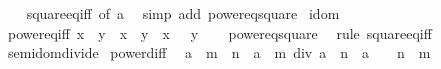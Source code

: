 \begin{isabellebody}
%
\isadelimproof
\ \ %
\endisadelimproof
%
\isatagproof
{}\isamarkupfalse%
\ square{\isacharunderscore}{\kern0pt}eq{\isacharunderscore}{\kern0pt}{}{\isacharunderscore}{\kern0pt}iff\ {\isacharbrackleft}{\kern0pt}of\ a{\isacharbrackright}{\kern0pt}\ \isamarkupfalse%
\ {\isacharparenleft}{\kern0pt}simp\ add{\isacharcolon}{\kern0pt}\ power{}{\isacharunderscore}{\kern0pt}eq{\isacharunderscore}{\kern0pt}square{\isacharparenright}{\kern0pt}%
\endisatagproof
{\isafoldproof}%
%
\isadelimproof
\isanewline
%
\endisadelimproof
\isanewline
{}\isamarkupfalse%
\isanewline
\isanewline
{}\isamarkupfalse%
\ idom\isanewline
{}\isanewline
\isanewline
{}\isamarkupfalse%
\ power{}{\isacharunderscore}{\kern0pt}eq{\isacharunderscore}{\kern0pt}iff{\isacharcolon}{\kern0pt}\ {\isachardoublequoteopen}x\ {\isacharequal}{\kern0pt}\ y\ {\isasymlongleftrightarrow}\ x\ {\isacharequal}{\kern0pt}\ y\ {\isasymor}\ x\ {\isacharequal}{\kern0pt}\ {\isacharminus}{\kern0pt}\ y{\isachardoublequoteclose}\isanewline
%
\isadelimproof
\ \ %
\endisadelimproof
%
\isatagproof
{}\isamarkupfalse%
\ power{}{\isacharunderscore}{\kern0pt}eq{\isacharunderscore}{\kern0pt}square\ \isamarkupfalse%
\ {\isacharparenleft}{\kern0pt}rule\ square{\isacharunderscore}{\kern0pt}eq{\isacharunderscore}{\kern0pt}iff{\isacharparenright}{\kern0pt}%
\endisatagproof
{\isafoldproof}%
%
\isadelimproof
\isanewline
%
\endisadelimproof
\isanewline
{}\isamarkupfalse%
\isanewline
\isanewline
{}\isamarkupfalse%
\ semidom{\isacharunderscore}{\kern0pt}divide\isanewline
{}\isanewline
\isanewline
{}\isamarkupfalse%
\ power{\isacharunderscore}{\kern0pt}diff{\isacharcolon}{\kern0pt}\isanewline
\ \ {\isachardoublequoteopen}a\ {\isacharcircum}{\kern0pt}\ {\isacharparenleft}{\kern0pt}m\ {\isacharminus}{\kern0pt}\ n{\isacharparenright}{\kern0pt}\ {\isacharequal}{\kern0pt}\ {\isacharparenleft}{\kern0pt}a\ {\isacharcircum}{\kern0pt}\ m{\isacharparenright}{\kern0pt}\ div\ {\isacharparenleft}{\kern0pt}a\ {\isacharcircum}{\kern0pt}\ n{\isacharparenright}{\kern0pt}{\isachardoublequoteclose}\ \ {\isachardoublequoteopen}a\ {\isasymnoteq}\ {}{\isachardoublequoteclose}\ \ {\isachardoublequoteopen}n\ {\isasymle}\ m{\isachardoublequoteclose}\isanewline
%
\isadelimproof
%
\endisadelimproof
%
\isatagproof
{}\isamarkupfalse%

\end{isabellebody}
